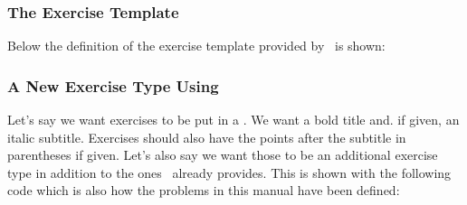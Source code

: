 \documentclass{xsim-manual}
\begin{document}
\subsubsection{The  Exercise Template}\label{sec:exercise-templ-default}

Below the definition of the  exercise
template provided by \xsim\ is shown:

\begin{sourcecode}
  {\par}
\end{sourcecode}

\subsubsection{A New Exercise Type Using }
Let's say we want exercises to be put in a . We want a bold
title and. if given, an italic subtitle.  Exercises should also have the
points after the subtitle in parentheses if given.  Let's also say we want
those to be an additional exercise type in addition to the ones \xsim\ already
provides.  This is shown with the following code which is also how the
problems in this manual have been defined:

\begin{sourcecode}
    {%
      \tcolorbox[
        colback = red!5!white ,
        colframe = red!75!black ,
        colbacktitle = yellow!50!red ,
        coltitle = red!25!black ,
        breakable ,
        drop shadow ,
        beforeafter skip = .5\baselineskip ,
        title =
          \textbf{\GetExerciseName~\GetExerciseProperty{counter}}%
          \GetExercisePropertyT{subtitle}{ \textit{\PropertyValue}}%
          \IfInsideSolutionF{%
            \GetExercisePropertyT{points}{ %
              (%
                \printgoal{\PropertyValue}
                \IfExerciseGoalSingularTF{points}
                  {\XSIMtranslate{point}}
                  {\XSIMtranslate{points}}%
              )%
            }%
          }%
      ]%
    }
    {\endtcolorbox}

\end{sourcecode}
\end{document}
